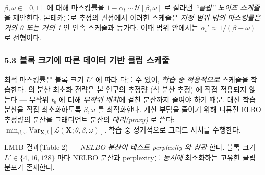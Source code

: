 \documentclass[
]{article}
\begin{document}
\(\beta, \omega \in [0, 1]\) 에 대해 마스킹률을
\(1-\alpha_t \sim \mathcal{U}[\beta, \omega]\) 로 잘라낸 \emph{``클립''
노이즈 스케줄} 을 제안한다. 몬테카를로 추정의 관점에서 이러한 스케줄은
\emph{지정 범위 밖의 마스킹률은 거의 0 또는 거의 1} 인 연속 스케줄과
등가다. 이때 범위 안에서는 \(\alpha_t' \approx 1/(\beta-\omega)\) 로
선형이다.

\hypertarget{uxbe14uxb85d-uxd06cuxae30uxc5d0-uxb530uxb978-uxb370uxc774uxd130-uxae30uxbc18-uxd074uxb9bd-uxc2a4uxcf00uxc904}{%
\subsubsection{5.3 블록 크기에 따른 데이터 기반 클립
스케줄}\label{uxbe14uxb85d-uxd06cuxae30uxc5d0-uxb530uxb978-uxb370uxc774uxd130-uxae30uxbc18-uxd074uxb9bd-uxc2a4uxcf00uxc904}}

최적 마스킹률은 블록 크기 \(L'\) 에 따라 다를 수 있어, \emph{학습 중
적응적으로} 스케줄을 학습한다. \cite{kingma2021variational} 의 분산
최소화 전략은 본 연구의 추정량 (식 분산 추정) 에 직접 적용되지 않는다
--- 무작위 \(t_b\) 에 더해 \emph{무작위 배치}에 걸친 분산까지 줄여야
하기 때문. 대신 학습 분산을 직접 최소화하도록 \(\beta, \omega\) 를
최적화한다. 계산 부담을 줄이기 위해 디퓨전 ELBO 추정량의 분산을
그래디언트 분산의 \emph{대리(proxy)} 로 쓴다:
\(\min_{\beta, \omega} \text{Var}_{\mathbf{X}, t}[\mathcal{L}(\mathbf{X}; \theta, \beta, \omega)]\).
학습 중 정기적으로 그리드 서치를 수행한다.

LM1B 결과(Table 2) --- \emph{NELBO 분산이 테스트 perplexity 와 상관}
한다. 블록 크기 \(L' \in \{4, 16, 128\}\) 마다 NELBO 분산과 perplexity를
\emph{동시에} 최소화하는 고유한 클립 분포가 존재한다.
\end{document}
